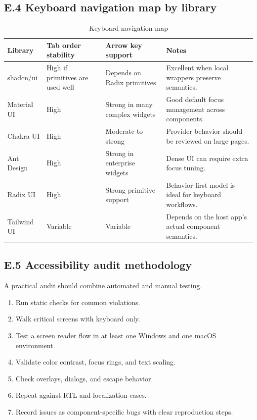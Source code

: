 \subsection*{E.4 Keyboard navigation map by library}
\begin{table}[htbp]
  \centering
  \caption{Keyboard navigation map}\label{tab:keyboard-map}
  \begin{tabularx}{\textwidth}{@{}p{}p{}p{}Y@{}}
    \toprule
    \textbf{Library} & \textbf{Tab order stability} & \textbf{Arrow key support} & \textbf{Notes} \\
    \midrule
    shadcn/ui & High if primitives are used well & Depends on Radix primitives & Excellent when local wrappers preserve semantics. \\
    Material UI & High & Strong in many complex widgets & Good default focus management across components. \\
    Chakra UI & High & Moderate to strong & Provider behavior should be reviewed on large pages. \\
    Ant Design & High & Strong in enterprise widgets & Dense UI can require extra focus tuning. \\
    Radix UI & High & Strong primitive support & Behavior-first model is ideal for keyboard workflows. \\
    Tailwind UI & Variable & Variable & Depends on the host app's actual component semantics. \\
    \bottomrule
  \end{tabularx}
\end{table}

\subsection*{E.5 Accessibility audit methodology}
A practical audit should combine automated and manual testing.

\begin{enumerate}[leftmargin=*, itemsep=0.35em]
  \item Run static checks for common violations.
  \item Walk critical screens with keyboard only.
  \item Test a screen reader flow in at least one Windows and one macOS environment.
  \item Validate color contrast, focus rings, and text scaling.
  \item Check overlays, dialogs, and escape behavior.
  \item Repeat against RTL and localization cases.
  \item Record issues as component-specific bugs with clear reproduction steps.
\end{enumerate}

